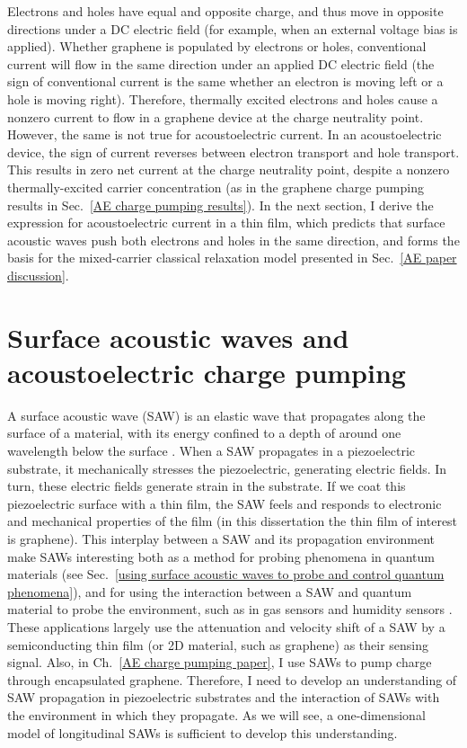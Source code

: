 \documentclass[double,12pt,1in,seploa]{beavtex}
\let\Oldsection\section
\renewcommand{\section}{\FloatBarrier\Oldsection}
\begin{document}
Electrons and holes have equal and opposite charge, and thus move in opposite directions under a DC electric field (for example, when an external voltage bias is applied). Whether graphene is populated by electrons or holes, conventional current will flow in the same direction under an applied DC electric field (the sign of conventional current is the same whether an electron is moving left or a hole is moving right). Therefore, thermally excited electrons and holes cause a nonzero current to flow in a graphene device at the charge neutrality point. However, the same is not true for acoustoelectric current. In an acoustoelectric device, the sign of current reverses between electron transport and hole transport. This results in zero net current at the charge neutrality point, despite a nonzero thermally-excited carrier concentration (as in the graphene charge pumping results in Sec.\ \ref{AE charge pumping results}). In the next section, I derive the expression for acoustoelectric current in a thin film, which predicts that surface acoustic waves push both electrons and holes in the same direction, and forms the basis for the mixed-carrier classical relaxation model presented in Sec.\ \ref{AE paper discussion}.

\section{Surface acoustic waves and acoustoelectric charge pumping}

A surface acoustic wave (SAW) is an elastic wave that propagates along the surface of a material, with its energy confined to a depth of around one wavelength below the surface \cite{rayleigh_waves_1885}. When a SAW propagates in a piezoelectric substrate, it mechanically stresses the piezoelectric, generating electric fields. In turn, these electric fields generate strain in the substrate. If we coat this piezoelectric surface with a thin film, the SAW feels and responds to electronic and mechanical properties of the film (in this dissertation the thin film of interest is graphene). This interplay between a SAW and its propagation environment make SAWs interesting both as a method for probing phenomena in quantum materials (see Sec.\ \ref{using surface acoustic waves to probe and control quantum phenomena}), and for using the interaction between a SAW and quantum material to probe the environment, such as in gas sensors and humidity sensors \cite{yang_gas_2017}. These applications largely use the attenuation and velocity shift of a SAW by a semiconducting thin film (or 2D material, such as graphene) as their sensing signal. Also, in Ch.\ \ref{AE charge pumping paper}, I use SAWs to pump charge through encapsulated graphene. Therefore, I need to develop an understanding of SAW propagation in piezoelectric substrates and the interaction of SAWs with the environment in which they propagate. As we will see, a one-dimensional model of longitudinal SAWs is sufficient to develop this understanding. 
\end{document}
